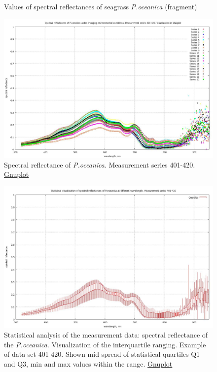 \documentclass[10pt, a4paper]{article}
\begin{document}
\begin{appendices}
\begin{figure}[h]
\begin{center}
		\caption{Values of spectral reflectances of seagrass \textit{P.oceanica} (fragment)}
		\label{fig:A.11}
	\end{center}
\end{figure}
\begin{figure}[h]
	\begin{center}
		\includegraphics[scale=0.20]{GNU-401-420.jpg}
		\caption{Spectral reflectance of \textit{P.oceanica}. Measurement series 401-420. \href{http://www.gnuplot.info/}{Gnuplot}}
		\label{fig:A.12}
	\end{center}
\end{figure}
\begin{figure}[h]
	\begin{center}
		\includegraphics[scale=0.20]{GNU-401-420-candles.jpg}
		\caption{Statistical analysis of the measurement data: spectral reflectance of the \textit{P.oceanica}. 
		Visualization of the interquartile ranging. Example of data set 401-420. Shown mid-spread of  statistical quartiles Q1 and Q3, min and max values within the range. \href{http://www.gnuplot.info/}{Gnuplot}}

\end{center}
\end{figure}
\end{appendices}
\end{document}
